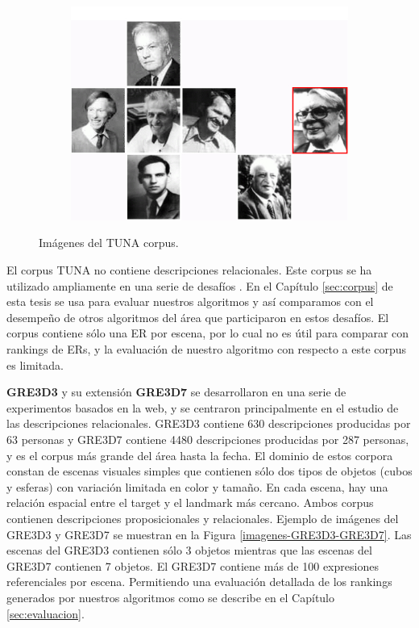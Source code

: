 \begin{figure}[!ht]
\begin{subfigure}{.5\textwidth}
\includegraphics[width=\textwidth]{images/tuna-people.jpg}\\[0pt]
\caption{}
\label{fig-TUNA-people}
\end{subfigure}
\caption{Im\'agenes del TUNA corpus.}\label{imagenes-tuna}
\end{figure}

El corpus TUNA no contiene descripciones relacionales. Este corpus se ha utilizado ampliamente en una serie de desaf\'ios \cite{gatt09}. En el Cap\'itulo \ref{sec:corpus} de esta tesis se usa para evaluar nuestros algoritmos y as\'i comparamos con el desempe\~no de otros algoritmos del \'area que participaron en estos desaf\'ios. El corpus contiene s\'olo una ER por escena, por lo cual no es \'util para comparar con rankings de ERs, y la evaluaci\'on de nuestro algoritmo con respecto a este corpus es limitada.\\

\label{sec:corpusGRE}

{\bf GRE3D3} y su extensi\'on {\bf GRE3D7} \cite{gre3d3,gre3d7} se desarrollaron en una serie de experimentos basados en la web, y se centraron principalmente en el estudio de las descripciones relacionales. GRE3D3 contiene 630 descripciones producidas por 63 personas y GRE3D7 contiene 4480 descripciones producidas por 287 personas, y es el corpus m\'as grande del \'area hasta la fecha. El dominio de estos corpora constan de escenas visuales simples que contienen s\'olo dos tipos de objetos (cubos y esferas) con variaci\'on limitada en color y tama\~no. En cada escena, hay una relaci\'on espacial entre el target y el landmark m\'as cercano. Ambos corpus contienen descripciones proposicionales y relacionales. Ejemplo de im\'agenes del GRE3D3 y GRE3D7 se muestran en la Figura \ref{imagenes-GRE3D3-GRE3D7}. Las escenas del GRE3D3 contienen s\'olo 3 objetos mientras que las escenas del GRE3D7 contienen 7 objetos. El GRE3D7 contiene m\'as de 100 expresiones referenciales por escena. Permitiendo una evaluaci\'on detallada de los rankings generados por nuestros algoritmos como se describe en el Cap\'itulo \ref{sec:evaluacion}.\\

